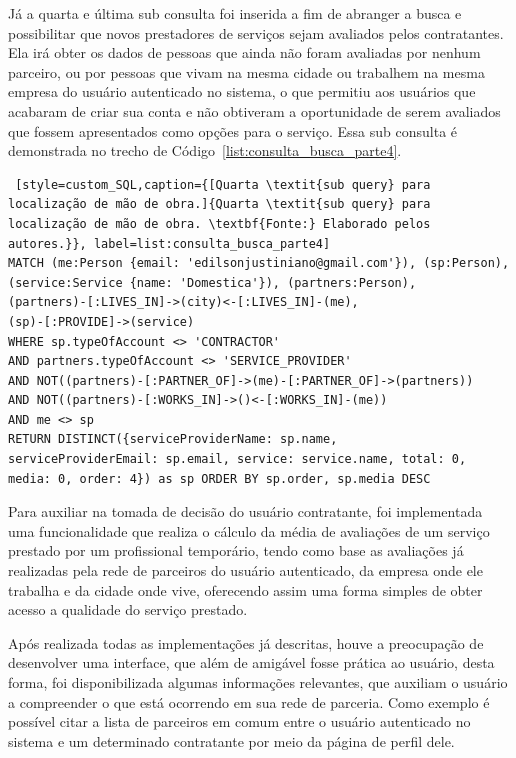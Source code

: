 Já a quarta e última sub consulta foi inserida a fim de abranger a busca e possibilitar que novos prestadores de serviços sejam avaliados pelos contratantes. Ela irá obter os dados de pessoas que ainda não foram avaliadas por nenhum parceiro, ou por pessoas que vivam na mesma cidade ou trabalhem na mesma empresa do usuário autenticado no sistema, o que permitiu aos usuários que acabaram de criar sua conta e não obtiveram a oportunidade de serem avaliados que fossem apresentados como opções para o serviço. Essa sub consulta é demonstrada no trecho de Código~\ref{list:consulta_busca_parte4}.


\begin{lstlisting} [style=custom_SQL,caption={[Quarta \textit{sub query} para localização de mão de obra.]{Quarta \textit{sub query} para localização de mão de obra. \textbf{Fonte:} Elaborado pelos autores.}}, label=list:consulta_busca_parte4] 	
MATCH (me:Person {email: 'edilsonjustiniano@gmail.com'}), (sp:Person),
(service:Service {name: 'Domestica'}), (partners:Person),
(partners)-[:LIVES_IN]->(city)<-[:LIVES_IN]-(me), 
(sp)-[:PROVIDE]->(service)
WHERE sp.typeOfAccount <> 'CONTRACTOR' 
AND partners.typeOfAccount <> 'SERVICE_PROVIDER'
AND NOT((partners)-[:PARTNER_OF]->(me)-[:PARTNER_OF]->(partners))
AND NOT((partners)-[:WORKS_IN]->()<-[:WORKS_IN]-(me))
AND me <> sp
RETURN DISTINCT({serviceProviderName: sp.name, 
serviceProviderEmail: sp.email, service: service.name, total: 0,
media: 0, order: 4}) as sp ORDER BY sp.order, sp.media DESC
\end{lstlisting}


\par Para auxiliar na tomada de decisão do usuário contratante, foi implementada uma funcionalidade que realiza o cálculo da média de avaliações de um serviço prestado por um profissional temporário, tendo como base as avaliações já realizadas pela rede de parceiros do usuário autenticado, da empresa onde ele trabalha e da cidade onde vive, oferecendo assim uma forma simples de obter acesso a qualidade do serviço prestado.

\par Após realizada todas as implementações já descritas, houve a preocupação de desenvolver uma interface, que além de amigável fosse prática ao usuário, desta forma, foi disponibilizada algumas informações relevantes, que auxiliam o usuário a compreender o que está ocorrendo em sua rede de parceria. Como exemplo é possível citar a lista de parceiros em comum entre o usuário autenticado no sistema e um determinado contratante por meio da página de perfil dele.

